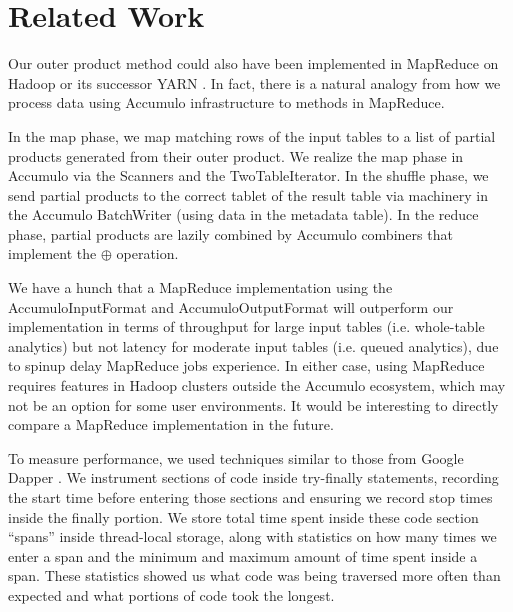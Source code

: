 \section{Related Work} %
Our outer product method could also have been implemented in MapReduce \cite{dean2008mapreduce} 
on Hadoop or its successor YARN \cite{vavilapalli2013apache}.
In fact, there is a natural analogy from
how we process data using Accumulo infrastructure to methods in MapReduce.

In the map phase, we map matching rows of the input tables to a list
of partial products generated from their outer product.
We realize the map phase in Accumulo via the Scanners and the TwoTableIterator.
In the shuffle phase, we send partial products to the correct tablet of the result
table via machinery in the Accumulo BatchWriter (using data in the metadata table).
In the reduce phase, partial products are lazily combined by Accumulo combiners 
that implement the $\oplus$ operation.

We have a hunch that a MapReduce implementation using the AccumuloInputFormat and AccumuloOutputFormat 
will outperform our implementation in terms of throughput for large input tables (i.e. whole-table analytics)
but not latency for moderate input tables (i.e. queued analytics), due to spinup delay MapReduce jobs experience.
In either case, using MapReduce requires features in Hadoop clusters outside the 
Accumulo ecosystem, which may not be an option for some user environments.
It would be interesting to directly compare a MapReduce implementation in the future.



To measure performance, we used techniques similar to those from Google Dapper \cite{sigelman2010dapper}.
We instrument sections of code inside try-finally statements, recording the start time before 
entering those sections and ensuring we record stop times inside the finally portion.
We store total time spent inside these code section ``spans'' inside thread-local storage,
along with statistics on how many times we enter a span and the minimum and maximum amount of time
spent inside a span. These statistics showed us what code was being traversed more often than expected
and what portions of code took the longest. 

